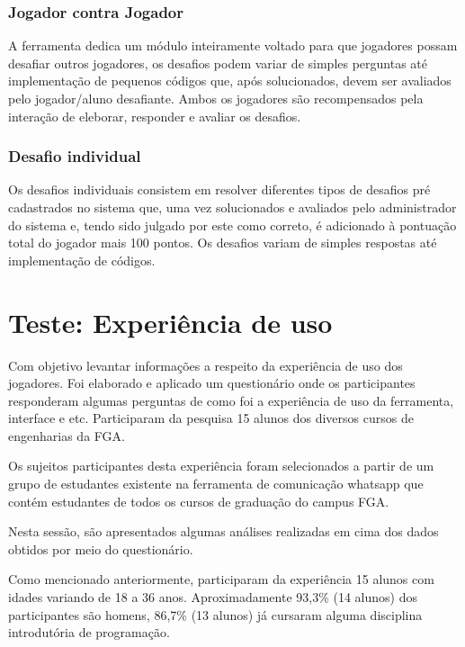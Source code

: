 \subsubsection{Jogador contra Jogador}
A ferramenta dedica um módulo inteiramente voltado para que jogadores possam desafiar outros jogadores, os
desafios podem variar de simples perguntas até implementação de pequenos códigos que, após solucionados, devem
ser avaliados pelo jogador/aluno desafiante. Ambos os jogadores são recompensados pela interação de eleborar, responder
e avaliar os desafios.


\subsubsection{Desafio individual}
Os desafios individuais consistem em resolver diferentes tipos de  desafios pré cadastrados no sistema que, uma vez 
solucionados e avaliados pelo administrador do sistema e, tendo sido julgado por este como correto, é adicionado à
pontuação total do jogador mais 100 pontos. Os  desafios variam de simples respostas até implementação de códigos.


\section{Teste: Experiência de uso}

Com objetivo levantar informações a respeito da experiência de uso dos jogadores. Foi elaborado e aplicado um questionário 
onde os participantes responderam algumas perguntas de como foi a experiência de uso da ferramenta, interface e etc. Participaram da pesquisa 15 alunos dos diversos cursos de engenharias da FGA.

Os sujeitos participantes desta experiência foram selecionados a partir de um grupo de estudantes existente na ferramenta de comunicação
whatsapp que contém estudantes de todos os cursos de graduação do campus FGA.

Nesta sessão, são apresentados algumas análises realizadas em cima dos dados obtidos por meio do questionário.

Como mencionado anteriormente, participaram da experiência 15 alunos com idades variando de 18 a 36 anos. 
Aproximadamente 93,3\% (14 alunos) dos participantes são homens, 86,7\% (13 alunos) já cursaram alguma
disciplina introdutória de programação.

